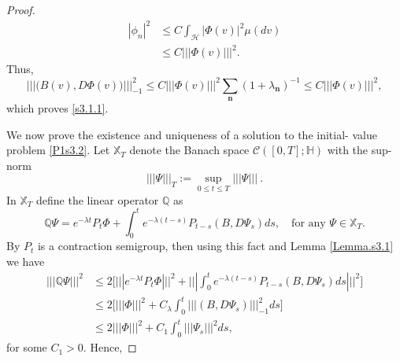 \documentclass[]{interact}
\theoremstyle{plain}%
\theoremstyle{definition}
\theoremstyle{remark}
\begin{document}
\begin{proof}
        \begin{align*}
            | \phi_n |^2 
                & 
                \le C \int_{\mathcal{H}}\big|  \Phi(v)\big|^2  \mu(dv)
            \\
                &
                \le C |||\Phi(v) |||^2  .
        \end{align*}
        Thus,
        $$
            ||| 
                \big(B(v),D\Phi(v) \big) 
            |||_{-1}^2 
                \le 
                    C |||\Phi(v) |||^2
                    \sum_{\mathbf{n}} (1+\lambda_{\mathbf{n}})^{-1}  
                \le C |||\Phi(v) |||^2 ,
        $$
         which proves \eqref{s3.1.1}.
        
            We now prove the existence and uniqueness of a solution to the 
            initial- 
        value problem \eqref{P1s3.2}. Let $\mathbb{X}_T$ denote the
        Banach space $\mathcal{C}([0,T];\mathbb{H})$ with the sup-norm
         \begin{equation*}
              |||\Psi |||_T := \sup_{0\le t\le T} |||\Psi ||| \ .
         \end{equation*}
        In $\mathbb{X}_T$ define the linear operator $\mathbb{Q}$ as
        \begin{equation*}
            \mathbb{Q}\Psi =  e^{-\lambda t} P_t
            \Phi 
            + \int_0^t e^{-\lambda (t-s)}P_{t-s}(B,D\Psi_s) ds,
            \quad \text{for any } \Psi \in \mathbb{X}_T.
        \end{equation*}
        By  $P_t$ is a contraction semigroup, then using this
        fact and Lemma \ref{Lemma.s3.1} we have
        \begin{align*}
            ||| \mathbb{Q}\Psi|||^2 
                &\le 
                2 
                \Bigg[ 
                    ||| e^{-\lambda t}P_t\Phi|||^2 
                    +
                    |||
                        \int_0^t e^{-\lambda (t-s)} 
                        P_{t-s}(B,D\Psi_s) ds 
                    |||^2
                \Bigg]
                \\
                &\le 2
                \Big[ 
                    |||\Phi|||^2 
                    + C_\lambda 
                    \int_0^t |||(B,D\Psi_s) |||_{-1}^2 ds
                \Big] \\
                &\le 2 
                |||\Phi|||^2 
                + C_1 
                \int_0^t |||\Psi_s|||^2 ds,
        \end{align*}
        for some $C_1>0$. Hence,

\end{proof}
\end{document}
